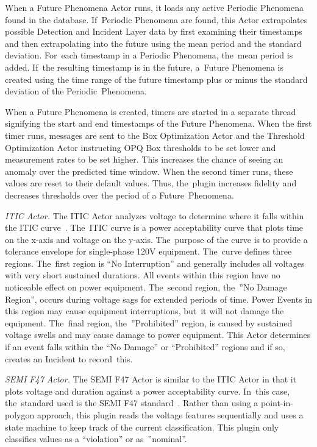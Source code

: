 \documentclass[energies,article,accept,moreauthors,pdftex]{Definitions/mdpi}
\begin{document}
When a Future Phenomena Actor runs, it loads any active Periodic Phenomena found in the database. If~Periodic Phenomena are found, this Actor extrapolates possible Detection and Incident Layer data by first examining their timestamps and then extrapolating into the future using the mean period and the standard deviation. For~each timestamp in a Periodic Phenomena, the~mean period is added. If~the resulting timestamp is in the future, a~Future Phenomena is created using the time range of the future timestamp plus or minus the standard deviation of the Periodic~Phenomena.

When a Future Phenomena is created, timers are started in a separate thread signifying the start and end timestamps of the Future Phenomena. When the first timer runs, messages are sent to the Box Optimization Actor and the Threshold Optimization Actor instructing OPQ Box thresholds to be set lower and measurement rates to be set higher. This increases the chance of seeing an anomaly over the predicted time window. When the second timer runs, these values are reset to their default values. Thus, the~plugin increases fidelity and decreases thresholds over the period of a Future~Phenomena.

{\em ITIC Actor.} The ITIC Actor analyzes voltage to determine where it falls within the ITIC curve~\cite{thallam_power_2000}. The~ITIC curve is a power acceptability curve that plots time on the x-axis and voltage on the y-axis. The~purpose of the curve is to provide a tolerance envelope for single-phase 120V equipment. The~curve defines three regions. The~first region is ``No Interruption'' and generally includes all voltages with very short sustained durations. All events within this region have no noticeable effect on power equipment. The~second region, the~''No Damage Region'', occurs during voltage sags for extended periods of time. Power Events in this region may cause equipment interruptions, but~it will not damage the equipment. The~final region, the~''Prohibited'' region, is caused by sustained voltage swells and may cause damage to power equipment. This Actor determines if an event falls within the ``No Damage'' or ``Prohibited'' regions and if so, creates an Incident to record~this.

{\em SEMI F47 Actor.} The SEMI F47 Actor is similar to the ITIC Actor in that it plots voltage and duration against a power acceptability curve. In~this case, the~standard used is the SEMI F47 standard~\cite{djokic_sensitivity_2005}. Rather than using a point-in-polygon approach, this plugin reads the voltage features sequentially and uses a state machine to keep track of the current classification. This plugin only classifies values as a ``violation'' or as~''nominal''.
\end{document}
